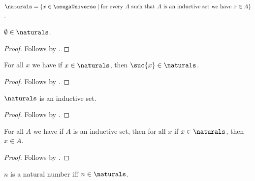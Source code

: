 \begin{definition}\label{omega}
    $\naturals = \{ x \in \omegaUniverse \mid
        \text{for every $A$ such that $A$ is an inductive set
        we have $x\in A$} \}$.
\end{definition}

\begin{proposition}\label{omega_empty}
    $\emptyset \in \naturals$.
\end{proposition}
\begin{proof}
    Follows by .
\end{proof}

\begin{proposition}\label{omega_successor}
    For all $x$ we have if $x\in\naturals$, then
    $\suc{x}\in\naturals$.
\end{proposition}
\begin{proof}
    Follows by .
\end{proof}

\begin{proposition}\label{omega_inductive}
    $\naturals$ is an inductive set.
\end{proposition}
\begin{proof}
    Follows by .
\end{proof}

\begin{proposition}\label{omega_minimal}
    For all $A$ we have if $A$ is an inductive set, then
    for all $x$ if $x\in\naturals$, then $x\in A$.
\end{proposition}
\begin{proof}
    Follows by .
\end{proof}

\begin{abbreviation}\label{natural_number}
    $n$ is a natural number iff $n\in\naturals$.
\end{abbreviation}
